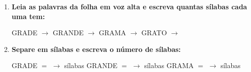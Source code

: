 \begin{exercicio}
\begin{enumerate}[resume]
  \item \textbf{Leia as palavras da folha em voz alta e escreva quantas sílabas cada uma tem:}

  \begin{center}
  GRADE $\rightarrow$ \underline{\hspace{1cm}} \quad GRANDE $\rightarrow$ \underline{\hspace{1cm}} \quad GRAMA $\rightarrow$ \underline{\hspace{1cm}} \quad GRATO $\rightarrow$ \underline{\hspace{1cm}}
  \end{center}

  \item \textbf{Separe em sílabas e escreva o número de sílabas:}
  \begin{center}
  GRADE $=$ \underline{\hspace{1.2cm}} $\rightarrow$ \underline{\hspace{0.8cm}} sílabas \quad GRANDE $=$ \underline{\hspace{1.2cm}} $\rightarrow$ \underline{\hspace{0.8cm}} sílabas \quad GRAMA $=$ \underline{\hspace{1.2cm}} $\rightarrow$ \underline{\hspace{0.8cm}} sílabas
  \end{center}

\end{enumerate}

\end{exercicio}



